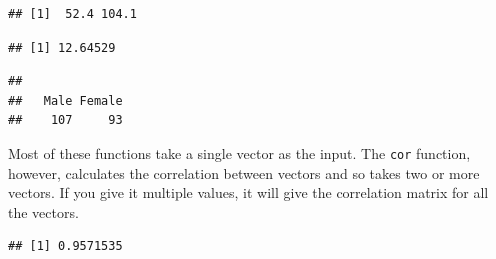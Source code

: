 \documentclass[]{book}
\makeatletter
\newenvironment{Shaded}{\begin{snugshade}}{\end{snugshade}}
\newcommand{\KeywordTok}[1]{\textcolor[rgb]{0.13,0.29,0.53}{\textbf{#1}}}
\newcommand{\DataTypeTok}[1]{\textcolor[rgb]{0.13,0.29,0.53}{#1}}
\newcommand{\StringTok}[1]{\textcolor[rgb]{0.31,0.60,0.02}{#1}}
\newcommand{\OtherTok}[1]{\textcolor[rgb]{0.56,0.35,0.01}{#1}}
\newcommand{\OperatorTok}[1]{\textcolor[rgb]{0.81,0.36,0.00}{\textbf{#1}}}
\newcommand{\NormalTok}[1]{#1}
\newenvironment{kframe}{%
\medskip{}
\setlength{\fboxsep}{.8em}
 \def\at@end@of@kframe{}%
 \ifinner\ifhmode%
  \def\at@end@of@kframe{\end{minipage}}%
  \begin{minipage}{\columnwidth}%
 \fi\fi%
 \def\FrameCommand##1{\hskip\@totalleftmargin \hskip-\fboxsep
 \colorbox{shadecolor}{##1}\hskip-\fboxsep
     \hskip-\linewidth \hskip-\@totalleftmargin \hskip\columnwidth}%
 \MakeFramed {\advance\hsize-\width
   \@totalleftmargin\z@ \linewidth\hsize
   \@setminipage}}%
 {\par\unskip\endMakeFramed%
 \at@end@of@kframe}
\renewenvironment{Shaded}{\begin{kframe}}{\end{kframe}}
\theoremstyle{definition}
\theoremstyle{definition}
\theoremstyle{definition}
\theoremstyle{remark}
\makeatother
\begin{document}
\begin{Shaded}
\end{Shaded}

\begin{verbatim}
## [1]  52.4 104.1
\end{verbatim}

\begin{Shaded}
\end{Shaded}

\begin{verbatim}
## [1] 12.64529
\end{verbatim}

\begin{Shaded}
\end{Shaded}

\begin{verbatim}
## 
##   Male Female 
##    107     93
\end{verbatim}

Most of these functions take a single vector as the input. The
\texttt{cor} function, however, calculates the correlation between
vectors and so takes two or more vectors. If you give it multiple
values, it will give the correlation matrix for all the vectors.

\begin{Shaded}
\end{Shaded}

\begin{verbatim}
## [1] 0.9571535
\end{verbatim}

\begin{Shaded}
\end{Shaded}
\end{document}
